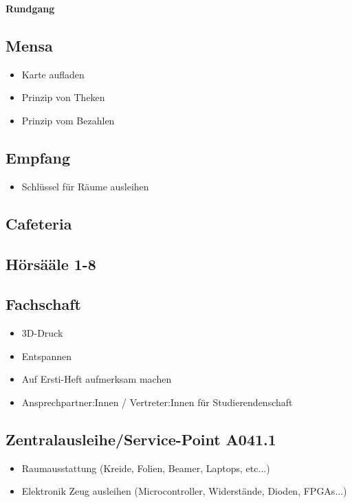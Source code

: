 \documentclass[11pt,ngerman]{scrartcl}
\begin{document}
\begin{center}
    {\LARGE \textbf{Rundgang}}
\end{center}
\vspace{-1em}

\subsection*{Mensa}
\begin{itemize}
    \item Karte aufladen
    \item Prinzip von Theken
    \item Prinzip vom Bezahlen
\end{itemize}

\subsection*{Empfang}
\begin{itemize}
    \item Schlüssel für Räume ausleihen
\end{itemize}

\subsection*{Cafeteria}

\subsection*{Hörsääle 1-8}

\subsection*{Fachschaft}
\begin{itemize}
    \item 3D-Druck
    \item Entspannen
    \item Auf Ersti-Heft aufmerksam machen
    \item Ansprechpartner:Innen / Vertreter:Innen für Studierendenschaft
\end{itemize}

\subsection*{Zentralausleihe/Service-Point A041.1}
\begin{itemize}
    \item Raumausstattung (Kreide, Folien, Beamer, Laptops, etc...)
    \item Elektronik Zeug ausleihen (Microcontroller, Widerstände, Dioden, FPGAs...)
\end{itemize}
\end{document}
